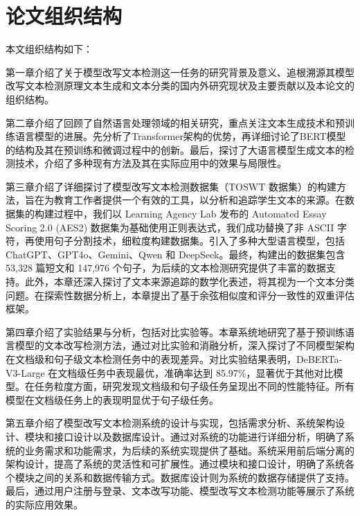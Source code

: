 \section{论文组织结构}
\label{sec:intro-paperarchitect}

本文组织结构如下：

第一章介绍了关于模型改写文本检测这一任务的研究背景及意义、追根溯源其模型改写文本检测原理文本生成和文本分类的国内外研究现状及主要贡献以及本论文的组织结构。

第二章介绍了回顾了自然语言处理领域的相关研究，重点关注文本生成技术和预训练语言模型的进展。先分析了Transformer架构的优势，再详细讨论了BERT模型的结构及其在预训练和微调过程中的创新。最后，探讨了大语言模型生成文本的检测技术，介绍了多种现有方法及其在实际应用中的效果与局限性。

第三章介绍了详细探讨了模型改写文本检测数据集（TOSWT 数据集）的构建方法，旨在为教育工作者提供一个有效的工具，以分析和追踪学生文本的来源。在数据集的构建过程中，我们以 Learning Agency Lab 发布的 Automated Essay Scoring 2.0 (AES2) 数据集为基础使用正则表达式，我们成功替换了非 ASCII 字符，再使用句子分割技术，细粒度构建数据集。引入了多种大型语言模型，包括 ChatGPT、GPT4o、Gemini、Qwen 和 DeepSeek。最终，构建出的数据集包含 53,328 篇短文和 147,976 个句子，为后续的文本检测研究提供了丰富的数据支持。此外，本章还深入探讨了文本来源追踪的数学化表述，将其视为一个文本分类问题。在探索性数据分析上，本章提出了基于余弦相似度和评分一致性的双重评估框架。

第四章介绍了实验结果与分析，包括对比实验等。本章系统地研究了基于预训练语言模型的文本改写检测方法，通过对比实验和消融分析，深入探讨了不同模型架构在文档级和句子级文本检测任务中的表现差异。对比实验结果表明，DeBERTa-V3-Large 在文档级任务中表现最优，准确率达到 85.97\%，显著优于其他对比模型。在任务粒度方面，研究发现文档级和句子级任务呈现出不同的性能特征。所有模型在文档级任务上的表现明显优于句子级任务。

第五章介绍了模型改写文本检测系统的设计与实现，包括需求分析、系统架构设计、模块和接口设计以及数据库设计。通过对系统的功能进行详细分析，明确了系统的业务需求和功能需求，为后续的系统实现提供了基础。系统采用前后端分离的架构设计，提高了系统的灵活性和可扩展性。通过模块和接口设计，明确了系统各个模块之间的关系和数据传输方式。数据库设计则为系统的数据存储提供了支持。最后，通过用户注册与登录、文本改写功能、模型改写文本检测功能等展示了系统的实际应用效果。